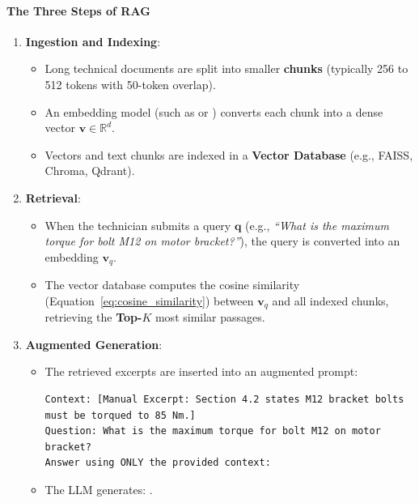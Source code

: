 \paragraph{The Three Steps of RAG}
\begin{enumerate}
    \item \textbf{Ingestion and Indexing}:
    \begin{itemize}
        \item Long technical documents are split into smaller \textbf{chunks} (typically 256 to 512 tokens with 50-token overlap).
        \item An embedding model (such as  or ) converts each chunk into a dense vector $\mathbf{v} \in \mathbb{R}^d$.
        \item Vectors and text chunks are indexed in a \textbf{Vector Database} (e.g., FAISS, Chroma, Qdrant).
    \end{itemize}
    \item \textbf{Retrieval}:
    \begin{itemize}
        \item When the technician submits a query $\mathbf{q}$ (e.g., \emph{``What is the maximum torque for bolt M12 on motor bracket?''}), the query is converted into an embedding $\mathbf{v}_q$.
        \item The vector database computes the cosine similarity (Equation~\eqref{eq:cosine_similarity}) between $\mathbf{v}_q$ and all indexed chunks, retrieving the \textbf{Top-$K$} most similar passages.
    \end{itemize}
    \item \textbf{Augmented Generation}:
    \begin{itemize}
        \item The retrieved excerpts are inserted into an augmented prompt:
        \begin{lstlisting}[style=outputstyle]
Context: [Manual Excerpt: Section 4.2 states M12 bracket bolts must be torqued to 85 Nm.]
Question: What is the maximum torque for bolt M12 on motor bracket?
Answer using ONLY the provided context:
        \end{lstlisting}
        \item The LLM generates: .
    \end{itemize}
\end{enumerate}

